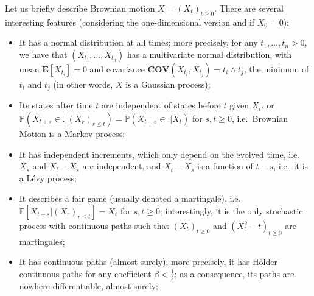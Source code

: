 \documentclass[lean]{Draft}
\begin{document}
Let us briefly describe Brownian motion $X = (X_t)_{t\geq 0}$. There are several interesting features (considering the one-dimensional version and if $X_0=0$):
\begin{itemize}
\item It has a normal distribution at all times; more precisely, for any $t_1,...,t_n > 0$, we have that $(X_{t_1},...,X_{t_n})$ has a multivariate normal distribution, with mean $\mathbf E[X_{t_i}] = 0$ and covariance $\mathbf{COV}(X_{t_i}, X_{t_j}) = t_i \wedge t_j$, the minimum of $t_i$ and $t_j$ (in other words, $X$ is a Gaussian process);
\item Its states after time $t$ are independent of states before $t$ given $X_t$, or $\mathbb P(X_{t+s} \in . | (X_r)_{r\leq t}) = \mathbb P(X_{t+s} \in . | X_t)$ for $s,t \ge 0$, i.e.\ Brownian Motion is a Markov process;
\item It has independent increments, which only depend on the evolved time, i.e.\ $X_s$ and $X_t - X_s$ are independent, and $X_t - X_s$ is a function of $t-s$, i.e.\ it is a Lévy process;
\item It describes a fair game (usually denoted a martingale), i.e.\ $\mathbb E[X_{t+s} | (X_r)_{r\leq t}] = X_t$ for $s,t \geq 0$; interestingly, it is the only stochastic process with continuous paths such that $(X_t)_{t\geq 0}$ and $(X_t^2 - t)_{t\geq 0}$ are martingales;
\item It has continuous paths (almost surely); more precisely, it has Hölder-continuous paths for any coefficient $\beta < \tfrac 12$; as a consequence, its paths are nowhere differentiable, almost surely;
\end{itemize}

\end{document}

